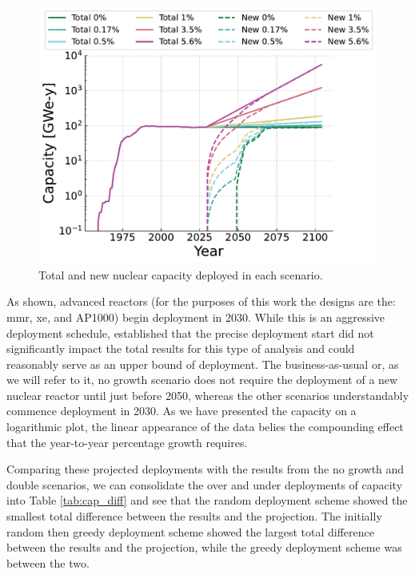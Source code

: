 \begin{figure}[H]
    \centering
    \includegraphics[scale=0.7]{images/results/deployment_calcs/total_new_capacity_scenarios.pdf}
    \caption{Total and new nuclear capacity deployed in each scenario.}
    \label{fig:dep_goals}
\end{figure}

As shown, advanced reactors (for the purposes of this work the designs are the:
\gls{mmr}, \gls{xe}, and AP1000) begin deployment in 2030. While this is an
aggressive deployment schedule, \cite{bachmann_thesis_2023} established that
the precise deployment start did not significantly impact the total results for
this type of analysis and could reasonably serve as an upper bound of
deployment. The business-as-usual or, as we will refer to it, no growth
scenario does not require the deployment of a new nuclear reactor until just
before 2050, whereas the other scenarios understandably commence deployment in
2030. As we have presented the capacity on a logarithmic plot, the linear
appearance of the data belies the compounding effect that the year-to-year
percentage growth requires.

Comparing these projected deployments with the results from the no growth and double scenarios, we can consolidate the over and under deployments of capacity into Table \ref{tab:cap_diff} and see that the random deployment scheme showed the smallest total difference between the results and the projection. The initially random then greedy deployment scheme showed the largest total difference between the results and the projection, while the greedy deployment scheme was between the two.

